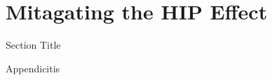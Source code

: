 \chapter{Mitagating the HIP Effect }{\label{appendix:a}}
\begin{section}{Section Title}

Appendicitis

\end{section}
